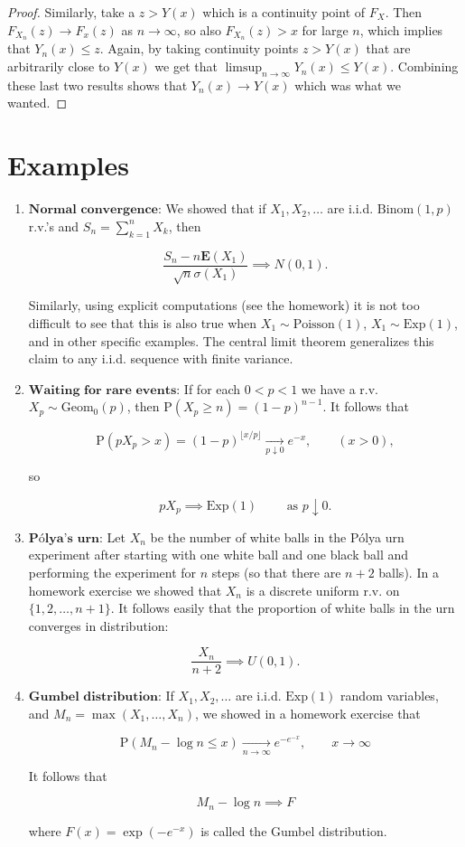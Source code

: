 \documentclass[11pt]{report}
\theoremstyle{plain}
\theoremstyle{definition}
\begin{document}
\begin{proof}
Similarly, take a $z>Y(x)$ which is a continuity
point of $F_X$. Then $F_{X_n}(z)\to F_x(z)$ as
$n\to\infty$, so also $F_{X_n}(z)>x$ for large $n$,
which implies that $Y_n(x)\le z$. Again, by taking
continuity points $z>Y(x)$ that are arbitrarily close
to $Y(x)$ we get that
$\limsup_{n\to\infty} Y_n(x) \le Y(x)$. Combining
these last two results shows that $Y_n(x)\to Y(x)$
which was what we wanted.
\end{proof}

\section{Examples}

\begin{enumerate}[label=\arabic*.]
\item $\textbf{Normal convergence:}$ We showed that if
$X_1,X_2,\ldots$ are i.i.d. $\textrm{Binom}(1,p)$
r.v.'s and $S_n=\sum_{k=1}^n X_k$, then

\[
\frac{S_n-n \mathbf{E}(X_1)}{\sqrt{n} \sigma(X_1)} \implies N(0,1).
\]

Similarly, using explicit computations (see the
homework) it is not too difficult to see that this is
also true when $X_1\sim \textrm{Poisson}(1)$,
$X_1 \sim \textrm{Exp}(1)$, and in other specific
examples. The central limit theorem generalizes this
claim to any i.i.d. sequence with finite variance.

\item $\textbf{Waiting for rare events:}$ If for each
$0<p<1$ we have a r.v. $X_p \sim \textrm{Geom}_0(p)$,
then $\mathrm{P}(X_p \ge n) = (1-p)^{n-1}$. It
follows that

\[
\mathrm{P}(p X_p > x) = (1-p)^{\lfloor x/p \rfloor} \xrightarrow[p\downarrow 0]{} e^{-x}, \qquad (x > 0),
\]

so

\[
p X_p \implies \textrm{Exp}(1)\qquad \textrm{ as }p\downarrow 0.
\]

\item $\textbf{Pólya's urn:}$ Let $X_n$ be the number of
white balls in the Pólya urn experiment after starting
with one white ball and one black ball and performing
the experiment for $n$ steps (so that there are $n+2$
balls). In a homework exercise we showed that $X_n$
is a discrete uniform r.v. on $\{1,2,\ldots,n+1\}$.
It follows easily that the proportion of white balls
in the urn converges in distribution:

\[
\frac{X_n}{n+2} \implies U(0,1).
\]

\item $\textbf{Gumbel distribution:}$ If $X_1,X_2,\ldots$
are i.i.d. $\textrm{Exp}(1)$ random variables, and
$M_n=\max(X_1,\ldots,X_n)$, we showed in a homework
exercise that

\[
\mathrm{P}(M_n-\log n \le x) \xrightarrow[n\to\infty]{} e^{-e^{-x}}, \qquad x\to\infty
\]

It follows that

\[
M_n-\log n \implies F
\]

where $F(x) = \exp\left(-e^{-x}\right)$ is called
the Gumbel distribution.
\end{enumerate}
\end{document}
